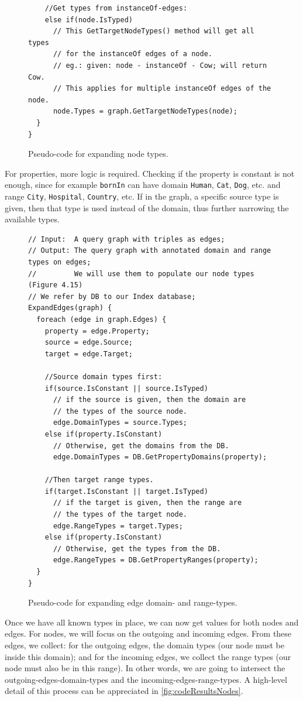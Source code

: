 \begin{example}
\begin{figure}[h]
\begin{verbatim}
    //Get types from instanceOf-edges:
    else if(node.IsTyped) 
      // This GetTargetNodeTypes() method will get all types
      // for the instanceOf edges of a node.
      // eg.: given: node - instanceOf - Cow; will return Cow.
      // This applies for multiple instanceOf edges of the node.
      node.Types = graph.GetTargetNodeTypes(node);
  }
}
\end{verbatim}
\caption{Pseudo-code for expanding node types.}
\label{fig:codeExpandNodes}
\end{figure}

For properties, more logic is required. Checking if the property is constant is not enough, since for example \texttt{bornIn} can have domain \texttt{Human}, \texttt{Cat}, \texttt{Dog}, etc. and range \texttt{City}, \texttt{Hospital}, \texttt{Country}, etc. If in the graph, a specific source type is given, then that type is used instead of the domain, thus further narrowing the available types.

\begin{figure}[h]
\begin{verbatim}
// Input:  A query graph with triples as edges;
// Output: The query graph with annotated domain and range types on edges;
//         We will use them to populate our node types (Figure 4.15)
// We refer by DB to our Index database;
ExpandEdges(graph) {
  foreach (edge in graph.Edges) {
    property = edge.Property;
    source = edge.Source;
    target = edge.Target;

    //Source domain types first:
    if(source.IsConstant || source.IsTyped)
      // if the source is given, then the domain are 
      // the types of the source node.
      edge.DomainTypes = source.Types;
    else if(property.IsConstant)
      // Otherwise, get the domains from the DB.
      edge.DomainTypes = DB.GetPropertyDomains(property);

    //Then target range types.
    if(target.IsConstant || target.IsTyped)
      // if the target is given, then the range are 
      // the types of the target node.
      edge.RangeTypes = target.Types;
    else if(property.IsConstant)
      // Otherwise, get the types from the DB.
      edge.RangeTypes = DB.GetPropertyRanges(property);
  }
}
\end{verbatim}
\caption{Pseudo-code for expanding edge domain- and range-types.}
\label{fig:codeExpandEdges}
\end{figure}

Once we have all known types in place, we can now get values for both nodes and edges. For nodes, we will focus on the outgoing and incoming edges. From these edges, we collect: for the outgoing edges, the domain types (our node must be inside this domain); and for the incoming edges, we collect the range types (our node must also be in this range). In other words, we are going to intersect the outgoing-edges-domain-types and the incoming-edges-range-types. A high-level detail of this process can be appreciated in \autoref{fig:codeResultsNodes}.


\end{example}
